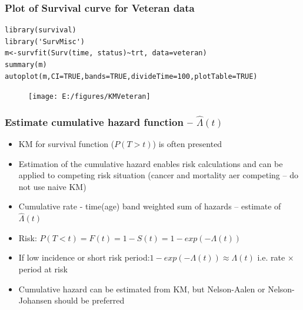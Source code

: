 \documentclass[12pt]{beamer}
\begin{document}
\begin{frame}[fragile]
\frametitle{Plot of Survival curve for Veteran data}

{\scriptsize \begin{verbatim}
library(survival)
library('SurvMisc')
m<-survfit(Surv(time, status)~trt, data=veteran)
summary(m)
autoplot(m,CI=TRUE,bands=TRUE,divideTime=100,plotTable=TRUE)
\end{verbatim}
}
\begin{figure}
\centering
\label{fig:KMVeteran}
\texttt{[image: E:/figures/KMVeteran]}
\end{figure}
\end{frame}

\begin{frame}[fragile]
\frametitle{Estimate cumulative hazard function -- $\hat \Lambda(t)$ }

\begin{itemize}
\item KM for survival function ($P(T>t)$) is often presented
\item Estimation of the cumulative hazard enables risk calculations and can be applied to competing risk situation (cancer and mortality aer competing -- do not use naive KM)
\item Cumulative rate - time(age) band weighted sum of hazards --
estimate of $\hat \Lambda(t)$
\item Risk: $P(T<t) =F(t)=1-S(t)=1-exp(- \Lambda(t))$
\item If low incidence or short risk period:\newline  $1-exp(- \Lambda(t)) \approx \Lambda(t)  $ \quad i.e. rate $\times$ period at risk
\item Cumulative hazard can be estimated from KM, but Nelson-Aalen or
Nelson-Johansen should be preferred
\end{itemize}
\end{frame}
\end{document}
